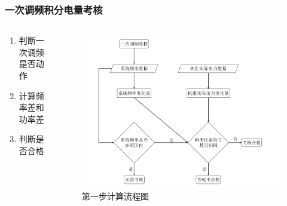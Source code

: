 \documentclass[aspectratio=169, 10pt, utf8, mathserif]{beamer}
\begin{document}
	\begin{frame}
	\frametitle{一次调频积分电量考核}
	
	\begin{columns}
		\begin{column}{.4\linewidth}
			\begin{enumerate}
				\item 判断一次调频是否动作
				\item 计算频率差和功率差
				\item 判断是否合格
			\end{enumerate}
		\end{column}
		
		\begin{column}{.6\linewidth}
		\begin{figure}[H]
			\centering
			\includegraphics[width=0.83\linewidth]{pic/screenshot030}
			\caption{第一步计算流程图}
			\label{fig:screenshot030}
		\end{figure}
			
		\end{column}
	\end{columns}
\end{frame}
\end{document}
